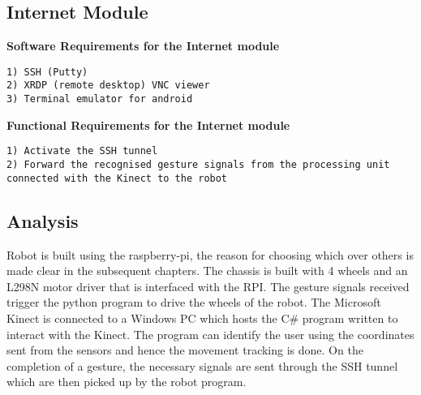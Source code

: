 \subsection{Internet Module}
\textbf{Software Requirements for the Internet module }
\begin{verbatim}
1) SSH (Putty)
2) XRDP (remote desktop) VNC viewer 
3) Terminal emulator for android
\end{verbatim}
\textbf{Functional Requirements for the Internet module}
\begin{verbatim}
1) Activate the SSH tunnel
2) Forward the recognised gesture signals from the processing unit connected with the Kinect to the robot
\end{verbatim}
\subsection{Analysis}
Robot is built using the raspberry-pi, the reason for choosing which over others is made clear in the subsequent chapters. The chassis is built with 4 wheels and an L298N motor driver that is interfaced with the RPI. The gesture signals received trigger the python program to drive the wheels of the robot. The Microsoft Kinect is connected to a Windows PC which hosts the C\# program written to interact with the Kinect. The program can identify the user using the coordinates sent from the sensors and hence the movement tracking is done. On the completion of a gesture, the necessary signals are sent through the SSH tunnel which are then picked up by the robot program.
